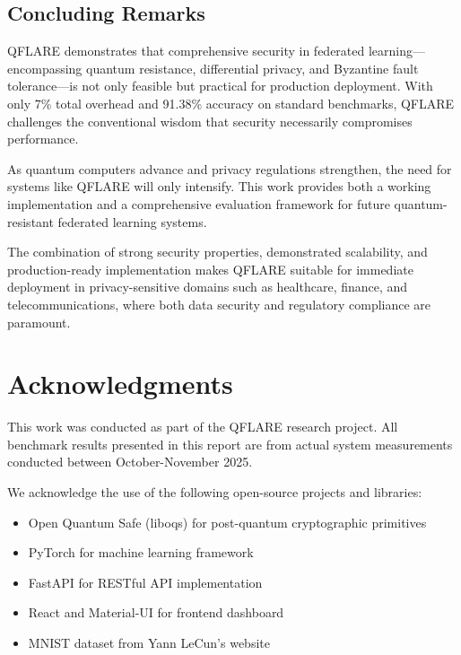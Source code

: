 \documentclass[12pt,a4paper]{article}
\begin{document}
\subsection{Concluding Remarks}

QFLARE demonstrates that comprehensive security in federated learning---encompassing quantum resistance, differential privacy, and Byzantine fault tolerance---is not only feasible but practical for production deployment. With only 7\% total overhead and 91.38\% accuracy on standard benchmarks, QFLARE challenges the conventional wisdom that security necessarily compromises performance.

As quantum computers advance and privacy regulations strengthen, the need for systems like QFLARE will only intensify. This work provides both a working implementation and a comprehensive evaluation framework for future quantum-resistant federated learning systems.

The combination of strong security properties, demonstrated scalability, and production-ready implementation makes QFLARE suitable for immediate deployment in privacy-sensitive domains such as healthcare, finance, and telecommunications, where both data security and regulatory compliance are paramount.

\section*{Acknowledgments}

This work was conducted as part of the QFLARE research project. All benchmark results presented in this report are from actual system measurements conducted between October-November 2025.

We acknowledge the use of the following open-source projects and libraries:
\begin{itemize}
    \item Open Quantum Safe (liboqs) for post-quantum cryptographic primitives
    \item PyTorch for machine learning framework
    \item FastAPI for RESTful API implementation
    \item React and Material-UI for frontend dashboard
    \item MNIST dataset from Yann LeCun's website
\end{itemize}
\end{document}
